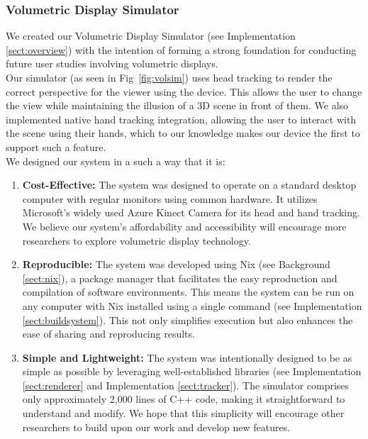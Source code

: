 \subsubsection{Volumetric Display Simulator}
We created our Volumetric Display Simulator (see Implementation \ref{sect:overview}) with the intention of forming a strong foundation for conducting future user studies involving volumetric displays. \\

Our simulator (as seen in Fig~\ref{fig:volsim}) uses head tracking to render the correct perspective for the viewer using the device. This allows the user to change the view while maintaining the illusion of a 3D scene in front of them. We also implemented native hand tracking integration, allowing the user to interact with the scene using their hands, which to our knowledge makes our device the first to support such a feature. \\

We designed our system in a such a way that it is: 

\begin{enumerate}
    \item \textbf{Cost-Effective:} The system was designed to operate on a standard desktop computer with regular monitors using common hardware. It utilizes Microsoft's widely used Azure Kinect Camera for its head and hand tracking. We believe our system's affordability and accessibility will encourage more researchers to explore volumetric display technology.

    \item \textbf{Reproducible:} The system was developed using Nix (see Background \ref{sect:nix}), a package manager that facilitates the easy reproduction and compilation of software environments. This means the system can be run on any computer with Nix installed using a single command (see Implementation \ref{sect:buildsystem}). This not only simplifies execution but also enhances the ease of sharing and reproducing results.

    \item \textbf{Simple and Lightweight:} The system was intentionally designed to be as simple as possible by leveraging well-established libraries (see Implementation \ref{sect:renderer} and Implementation \ref{sect:tracker}). The simulator comprises only approximately 2,000 lines of C++ code, making it straightforward to understand and modify. We hope that this simplicity will encourage other researchers to build upon our work and develop new features.
\end{enumerate}

